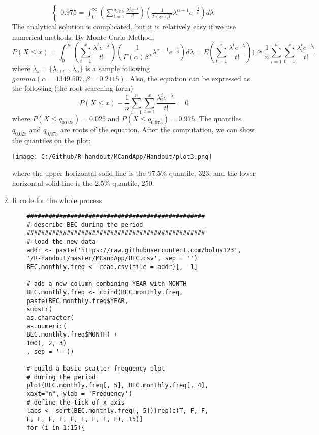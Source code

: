 \documentclass[12pt]{article}
\begin{document}
\begin{enumerate}
\begin{equation*}
\begin{cases}
	0.975 = \int_{0}^{\infty}(\sum_{t = 1}^{q_{0.975}}\frac{\lambda^{t}e^{-\lambda}}{t!})(\frac{1}{\Gamma(\alpha)\beta^{\alpha}}\lambda^{\alpha - 1}e^{-\frac{\lambda}{\beta}}) d \lambda
	\end{cases}
	\end{equation*}
	The analytical solution is complicated, but it is relatively easy if we use numerical methods. By Monte Carlo Method,
	\begin{equation*}
	P(X \le x) = \int_{0}^{\infty}(\sum_{t = 1}^{x}\frac{\lambda^{t}e^{-\lambda}}{t!})(\frac{1}{\Gamma(\alpha)\beta^{\alpha}}\lambda^{\alpha - 1}e^{-\frac{\lambda}{\beta}}) d \lambda = E(\sum_{t = 1}^{x}\frac{\lambda^{t}e^{-\lambda}}{t!})) \approxeq \frac{1}{n} \sum_{i = 1}^{n} \sum_{t = 1}^{x}\frac{\lambda_i^{t}e^{-\lambda_i}}{t!}
	\end{equation*}
	where $\lambda_s = \{\lambda_1,...,\lambda_n \}$ is a sample following $gamma(\alpha= 1349.507, \beta = 0.2115)$. Also, the equation can be expressed as the following (the root searching form)
	\begin{equation*}
	P(X \le x) - \frac{1}{n} \sum_{i = 1}^{n} \sum_{t = 1}^{x}\frac{\lambda_i^{t}e^{-\lambda_i}}{t!} = 0
	\end{equation*}
	where $P(X \le q_{0.025}) = 0.025$ and $P(X \le  q_{0.975}) = 0.975$. The quantiles $q_{0.025}$ and $q_{0.975}$ are roots of the equation. After the computation, we can show the quantiles on the plot:
	\begin{center}
		\texttt{[image: C:/Github/R-handout/MCandApp/Handout/plot3.png]}
	\end{center}
	where the upper horizontal solid line is the 97.5\% quantile, 323, and the lower horizontal solid line is the 2.5\% quantile, 250.
	\item R code for the whole process
	\begin{verbatim}
	#################################################
	# describe BEC during the period
	#################################################
	# load the new data
	addr <- paste('https://raw.githubusercontent.com/bolus123', 
	'/R-handout/master/MCandApp/BEC.csv', sep = '')
	BEC.monthly.freq <- read.csv(file = addr)[, -1]
	
	# add a new column combining YEAR with MONTH
	BEC.monthly.freq <- cbind(BEC.monthly.freq, 
	paste(BEC.monthly.freq$YEAR, 
	substr(
	as.character(
	as.numeric(
	BEC.monthly.freq$MONTH) + 
	100), 2, 3)
	, sep = '-'))
	
	# build a basic scatter frequency plot 
	# during the period
	plot(BEC.monthly.freq[, 5], BEC.monthly.freq[, 4], 
	xaxt="n", ylab = 'Frequency')
	# define the tick of x-axis
	labs <- sort(BEC.monthly.freq[, 5])[rep(c(T, F, F, 
	F, F, F, F, F, F, F, F, F), 15)]
	for (i in 1:15){
	

\end{verbatim}
\end{enumerate}
\end{document}

